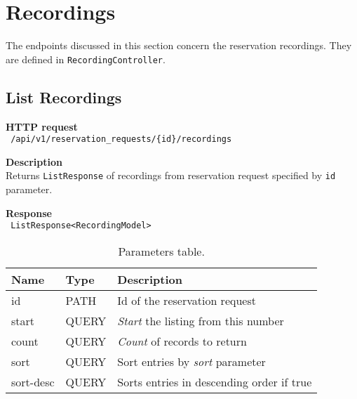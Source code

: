 \section{Recordings}
The endpoints discussed in this section concern the reservation recordings. They are defined in \texttt{RecordingController}.

\subsection{List Recordings}
\begin{description}
    \item \textbf{HTTP request}\\
        \texttt{\text{[GET]} /api/v1/reservation\_requests/\{id\}/recordings}
    \item \textbf{Description}\\
        Returns \texttt{ListResponse} of recordings from reservation request specified by \texttt{id} parameter.
    \item \textbf{Response}\\
        \texttt{\text{[200 OK]} ListResponse<RecordingModel>}
\end{description}
\begin{table}[ht!]
    \begin{tabularx}{\textwidth}{llX}
        \toprule
        Name & Type & Description \\
        \midrule
        id & PATH & Id of the reservation request \\ 
        start & QUERY & \emph{Start} the listing from this number \\  
        count & QUERY & \emph{Count} of records to return \\
        sort & QUERY & Sort entries by \emph{sort} parameter \\
        sort-desc & QUERY & Sorts entries in descending order if true \\
        \bottomrule
        \end{tabularx}
    \caption{Parameters table.}
\end{table}
